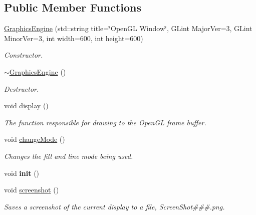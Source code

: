 \subsection*{Public Member Functions}
\begin{DoxyCompactItemize}
\item 
\hyperlink{class_graphics_engine_a458fa2b36f864e0820a0a54ad58ff1c3}{Graphics\+Engine} (std\+::string title=\char`\"{}Open\+GL Window\char`\"{}, G\+Lint Major\+Ver=3, G\+Lint Minor\+Ver=3, int width=600, int height=600)
\begin{DoxyCompactList}\small\item\em Constructor. \end{DoxyCompactList}\item 
\hyperlink{class_graphics_engine_ab67afeefbc9f1c284f6ce310c31ae8f6}{$\sim$\+Graphics\+Engine} ()
\begin{DoxyCompactList}\small\item\em Destructor. \end{DoxyCompactList}\item 
void \hyperlink{class_graphics_engine_a2f0bdf1a47bf9e8d4f1c9525c2ebc8f9}{display} ()
\begin{DoxyCompactList}\small\item\em The function responsible for drawing to the Open\+GL frame buffer. \end{DoxyCompactList}\item 
\mbox{\label{class_graphics_engine_a7f549d3ad00c34e61d067fdd2a911034}} 
void \hyperlink{class_graphics_engine_a7f549d3ad00c34e61d067fdd2a911034}{change\+Mode} ()
\begin{DoxyCompactList}\small\item\em Changes the fill and line mode being used. \end{DoxyCompactList}\item 
\mbox{\label{class_graphics_engine_a788be2ee3b219fe44ca484a9a4e3d21f}} 
void {\bfseries init} ()
\item 
\mbox{\label{class_graphics_engine_a7b12982b41cbdb107f48863798be2ed7}} 
void \hyperlink{class_graphics_engine_a7b12982b41cbdb107f48863798be2ed7}{screenshot} ()
\begin{DoxyCompactList}\small\item\em Saves a screenshot of the current display to a file, Screen\+Shot\#\#\#.png. \end{DoxyCompactList}\item 

\end{DoxyCompactItemize}
